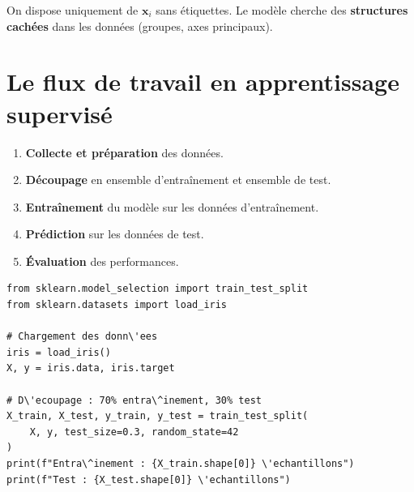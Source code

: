 \begin{definition}
On dispose uniquement de $\mathbf{x}_i$ sans \'etiquettes. Le mod\`ele cherche des \textbf{structures cach\'ees} dans les donn\'ees (groupes, axes principaux).
\end{definition}

\section{Le flux de travail en apprentissage supervis\'e}
\label{sec:workflow_ml}


\begin{center}
\end{center}

\begin{enumerate}
    \item \textbf{Collecte et pr\'eparation} des donn\'ees.
    \item \textbf{D\'ecoupage} en ensemble d'entra\^inement et ensemble de test.
    \item \textbf{Entra\^inement} du mod\`ele sur les donn\'ees d'entra\^inement.
    \item \textbf{Pr\'ediction} sur les donn\'ees de test.
    \item \textbf{\'Evaluation} des performances.
\end{enumerate}

\begin{codeblock}[title=\textbf{Python}]
\begin{verbatim}
from sklearn.model_selection import train_test_split
from sklearn.datasets import load_iris

# Chargement des donn\'ees
iris = load_iris()
X, y = iris.data, iris.target

# D\'ecoupage : 70% entra\^inement, 30% test
X_train, X_test, y_train, y_test = train_test_split(
    X, y, test_size=0.3, random_state=42
)
print(f"Entra\^inement : {X_train.shape[0]} \'echantillons")
print(f"Test : {X_test.shape[0]} \'echantillons")
\end{verbatim}
\end{codeblock}

